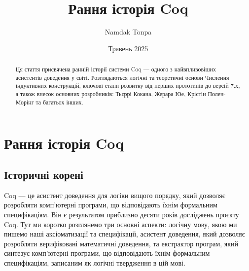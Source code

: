 \documentclass{article}
\begin{document}
\title{Рання історія Coq}
\author{Namdak Tonpa}
\date{Травень 2025}
\maketitle

\begin{abstract}
Ця стаття присвячена ранній історії системи Coq — одного з найвпливовіших асистентів доведення у світі. Розглядаються логічні та теоретичні основи Числення індуктивних конструкцій, ключові етапи розвитку від перших прототипів до версій 7.x, а також внесок основних розробників: Тьєррі Кокана, Жерара Юе, Крістін Полен-Морінг та багатьох інших.
\end{abstract}

\section{Рання історія Coq}

\subsection{Історичні корені}

Coq — це асистент доведення для логіки вищого порядку, який дозволяє розробляти комп’ютерні програми, що відповідають їхнім формальним специфікаціям. Він є результатом приблизно десяти років досліджень проєкту Coq. Тут ми коротко розглянемо три основні аспекти: логічну мову, якою ми пишемо наші аксіоматизації та специфікації, асистент доведення, який дозволяє розробляти верифіковані математичні доведення, та екстрактор програм, який синтезує комп’ютерні програми, що відповідають їхнім формальним специфікаціям, записаним як логічні твердження в цій мові.
\end{document}
